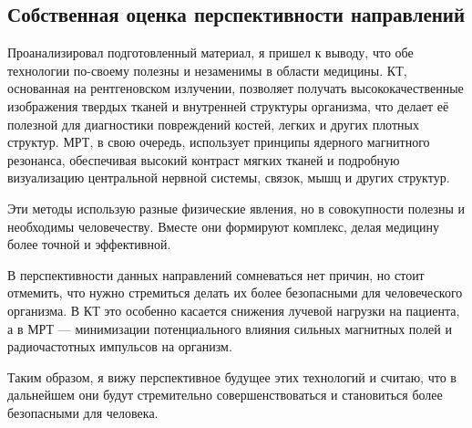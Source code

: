 \subsection{Собственная оценка перспективности направлений}
Проанализировал подготовленный материал, я пришел к выводу, что обе технологии по-своему полезны и незаменимы в области медицины.
КТ, основанная на рентгеновском излучении, позволяет получать высококачественные изображения твердых тканей и внутренней структуры организма, что делает её полезной для диагностики повреждений костей, легких и других плотных структур. МРТ, в свою очередь, использует принципы ядерного магнитного резонанса, обеспечивая высокий контраст мягких тканей и подробную визуализацию центральной нервной системы, связок, мышц и других структур.

Эти методы использую разные физические явления, но в совокупности полезны и необходимы человечеству. Вместе они формируют комплекс, делая медицину более точной и эффективной.

В перспективности данных направлений сомневаться нет причин, но стоит отмемить, что нужно стремиться делать их более безопасными для человеческого организма. В КТ это особенно касается снижения лучевой нагрузки на пациента, а в МРТ — минимизации потенциального влияния сильных магнитных полей и радиочастотных импульсов на организм.

Таким образом, я вижу перспективное будущее этих технологий и считаю, что в дальнейшем они будут стремительно совершенствоваться и становиться более безопасными для человека.